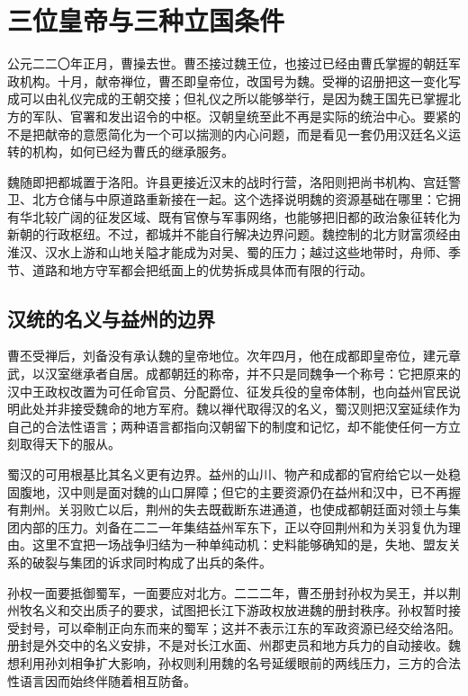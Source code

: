 \section{三位皇帝与三种立国条件}

公元二二〇年正月，曹操去世。曹丕接过魏王位，也接过已经由曹氏掌握的朝廷军政机构。十月，献帝禅位，曹丕即皇帝位，改国号为魏。受禅的诏册把这一变化写成可以由礼仪完成的王朝交接；但礼仪之所以能够举行，是因为魏王国先已掌握北方的军队、官署和发出诏令的中枢。汉朝皇统至此不再是实际的统治中心。要紧的不是把献帝的意愿简化为一个可以揣测的内心问题，而是看见一套仍用汉廷名义运转的机构，如何已经为曹氏的继承服务。

魏随即把都城置于洛阳。许县更接近汉末的战时行营，洛阳则把尚书机构、宫廷警卫、北方仓储与中原道路重新接在一起。这个选择说明魏的资源基础在哪里：它拥有华北较广阔的征发区域、既有官僚与军事网络，也能够把旧都的政治象征转化为新朝的行政枢纽。不过，都城并不能自行解决边界问题。魏控制的北方财富须经由淮汉、汉水上游和山地关隘才能成为对吴、蜀的压力；越过这些地带时，舟师、季节、道路和地方守军都会把纸面上的优势拆成具体而有限的行动。

\subsection{汉统的名义与益州的边界}

曹丕受禅后，刘备没有承认魏的皇帝地位。次年四月，他在成都即皇帝位，建元章武，以汉室继承者自居。成都朝廷的称帝，并不只是同魏争一个称号：它把原来的汉中王政权改置为可任命官员、分配爵位、征发兵役的皇帝体制，也向益州官民说明此处并非接受魏命的地方军府。魏以禅代取得汉的名义，蜀汉则把汉室延续作为自己的合法性语言；两种语言都指向汉朝留下的制度和记忆，却不能使任何一方立刻取得天下的服从。

蜀汉的可用根基比其名义更有边界。益州的山川、物产和成都的官府给它以一处稳固腹地，汉中则是面对魏的山口屏障；但它的主要资源仍在益州和汉中，已不再握有荆州。关羽败亡以后，荆州的失去既截断东进通道，也使成都朝廷面对领土与集团内部的压力。刘备在二二一年集结益州军东下，正以夺回荆州和为关羽复仇为理由。这里不宜把一场战争归结为一种单纯动机：史料能够确知的是，失地、盟友关系的破裂与集团的诉求同时构成了出兵的条件。

孙权一面要抵御蜀军，一面要应对北方。二二二年，曹丕册封孙权为吴王，并以荆州牧名义和交出质子的要求，试图把长江下游政权放进魏的册封秩序。孙权暂时接受封号，可以牵制正向东而来的蜀军；这并不表示江东的军政资源已经交给洛阳。册封是外交中的名义安排，不是对长江水面、州郡吏员和地方兵力的自动接收。魏想利用孙刘相争扩大影响，孙权则利用魏的名号延缓眼前的两线压力，三方的合法性语言因而始终伴随着相互防备。


